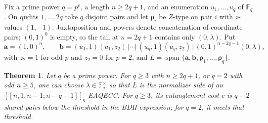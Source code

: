 \documentclass{article}
\newtheorem{theorem}{Theorem}
\newcommand{\F}{\mathbb{F}}
\newcommand{\vct}[1]{\boldsymbol{#1}} %
\begin{document}
Fix a prime power $q=p^e$, a length $n\ge 2q+1$, and an enumeration
$u_1,\dots,u_q$ of $\F_q$. On qudits $1,\dots,2q$ take $q$ disjoint pairs
and let $\vct{\rho}_i$ be $Z$-type on pair $i$ with $z$-values $(1,-1)$.
Juxtaposition and powers denote concatenation of coordinate pairs;
$(0,1)^0$ is empty, so the tail at $n=2q+1$ contains only $(0,\lambda)$. Put
\[
  \vct{a}=(1,0)^{n},\qquad
  \vct{b}=(u_1,1)(u_1,z_2)\,\big|\cdots\big|\,(u_q,1)(u_q,z_2)\,\big|\,
    (0,1)^{n-2q-1}(0,\lambda),
\]
with $z_2=1$ for odd $p$ and $z_2=0$ for $p=2$, and
$L=\operatorname{span}\{\vct{a},\vct{b},\vct{\rho}_1,\dots,\vct{\rho}_q\}$.
\begin{theorem}\label{thm:unified}
Let $q$ be a prime power. For $q\ge3$ with $n\ge2q+1$, or $q=2$
with odd $n\ge5$, one can choose $\lambda\in\F_q^{\times}$ so that
$L$ is the normalizer side of an $[[n,1,n-1;n-q-1]]_q$ EAQECC.
For $q\ge3$, its entanglement cost $c$ is $q-2$ shared pairs below
the threshold in the BDH expression; for $q=2$, it meets that threshold.
\end{theorem}
\end{document}
